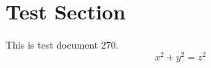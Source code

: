 \documentclass{article}
\begin{document}
\section{Test Section}
This is test document 270.
\begin{equation}
x^2 + y^2 = z^2
\end{equation}
\end{document}
